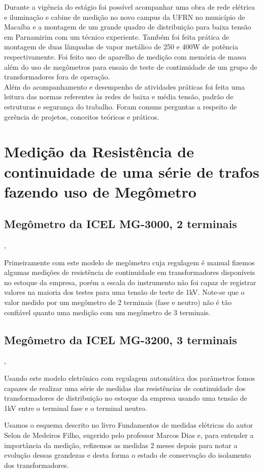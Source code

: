 
	Durante a vigência do estágio foi possível acompanhar uma obra de rede elétrica e iluminação e cabine de medição no novo campus da UFRN no município de Macaíba e a montagem de um grande quadro de distribuição para baixa tensão em Parnamirim com um técnico experiente. Também foi feita prática de montagem de duas lâmpadas de vapor metálico de 250 e 400W de potência respectivamente. Foi feito uso de aparelho de medição com memória de massa além do uso de megômetros para ensaio de teste de continuidade de um grupo de transformadores fora de operação. \\ 

	
	Além do acompanhamento e desempenho de atividades práticas foi feita uma leitura das normas referentes às redes de baixa e média tensão, padrão de estruturas e segurança do trabalho. Foram comuns perguntas a respeito de gerência de projetos, conceitos teóricos e práticos.  
		
\section{Medição da Resistência de continuidade de uma série de trafos fazendo uso de Megômetro}
 \subsection{Megômetro da ICEL MG-3000, 2 terminais},

   Primeiramente com este modelo de megômetro cuja regulagem é manual fizemos algumas medições de resistência de continuidade em transformadores disponíveis no estoque da empresa, porém a escala do instrumento não foi capaz de registrar valores na maioria dos testes para uma tensão de teste de 1kV. Note-se que o valor medido por um megômetro de 2 terminais (fase e neutro) não é tão confiável quanto uma medição com um megômetro de 3 terminais.
   \\
 \subsection{Megômetro da ICEL MG-3200, 3 terminais},
 
 
   Usando este modelo eletrônico com regulagem automática dos parâmetros fomos capazes de realizar uma série de medidas das resistências de continuidade dos transformadores de distribuição no estoque da empresa usando uma tensão de 1kV entre o terminal fase e o terminal neutro. 
   
   Usamos o esquema descrito no livro Fundamentos de medidas elétricas do autor Selon de Medeiros Filho, sugerido pelo professor Marcos Dias e, para entender a importância da medição, refizemos as medidas 2 meses depois para notar a evolução dessas grandezas e desta forma o estado de conservação do isolamento dos transformadores.
   
